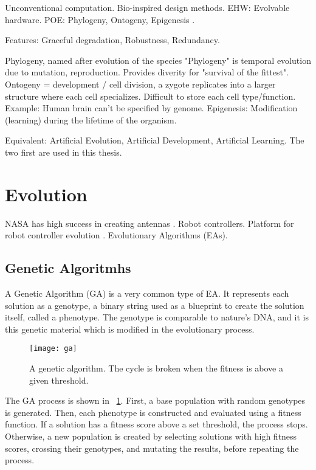 \TODO
Unconventional computation.
Bio-inspired design methods.
EHW: Evolvable hardware.
POE: Phylogeny, Ontogeny, Epigenesis \cite{sipper1997poe}.

Features: Graceful degradation, Robustness, Redundancy.

\TODO
Phylogeny, named after evolution of the species "Phylogeny" is temporal evolution due to mutation, reproduction.
Provides diverity for "survival of the fittest".
Ontogeny = development / cell division, a zygote replicates into a larger structure where each cell specializes.
Difficult to store each cell type/function.
Example: Human brain can't be specified by genome.
Epigenesis: Modification (learning) during the lifetime of the organism.

\TODO
Equivalent: Artificial Evolution, Artificial Development, Artificial Learning.
The two first are used in this thesis.


\section{Evolution}

\TODO
NASA has high success in creating antennas \cite{hornby2006antenna}.
Robot controllers.
Platform for robot controller evolution \cite{haddow1999robot}.
Evolutionary Algorithms (EAs).

\subsection{Genetic Algoritmhs}

A Genetic Algorithm (GA) is a very common type of EA.
It represents each solution as a genotype, a binary string used as a blueprint to create the solution itself, called a phenotype.
The genotype is comparable to nature's DNA, and it is this genetic material which is modified in the evolutionary process.

\begin{figure}[!ht]
    \centering
    \texttt{[image: ga]}
    \caption[Genetic Algorithm]{
        A genetic algorithm.
        The cycle is broken when the fitness is above a given threshold.
    }
    \label{fig:ga}
\end{figure}

The GA process is shown in \figurename~\ref{fig:ga}.
First, a base population with random genotypes is generated.
Then, each phenotype is constructed and evaluated using a fitness function.
If a solution has a fitness score above a set threshold, the process stops.
Otherwise, a new population is created by selecting solutions with high fitness scores, crossing their genotypes, and mutating the results, before repeating the process.

